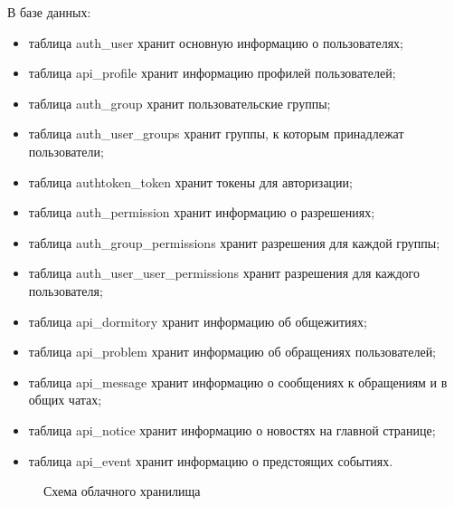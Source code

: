 \documentclass{../includes/TechDoc}
\begin{document}
    В базе данных:
    \begin{itemize}[noitemsep]
        \item таблица auth\_user хранит основную информацию о пользователях;
        \item таблица api\_profile хранит информацию профилей пользователей;
        \item таблица auth\_group хранит пользовательские группы;
        \item таблица auth\_user\_groups хранит группы, к которым принадлежат пользователи;
        \item таблица authtoken\_token хранит токены для авторизации;
        \item таблица auth\_permission хранит информацию о разрешениях;
        \item таблица auth\_group\_permissions хранит разрешения для каждой группы;
        \item таблица auth\_user\_user\_permissions хранит разрешения для каждого пользователя;
        \item таблица api\_dormitory хранит информацию об общежитиях;
        \item таблица api\_problem хранит информацию об обращениях пользователей;
        \item таблица api\_message хранит информацию о сообщениях к обращениям и в общих чатах;
        \item таблица api\_notice хранит информацию о новостях на главной странице;
        \item таблица api\_event хранит информацию о предстоящих событиях.
    \end{itemize}

    \begin{figure}[h]
        \centering
        \caption{Схема облачного хранилища}
        \label{fig:api_scheme}
    \end{figure}
\end{document}
